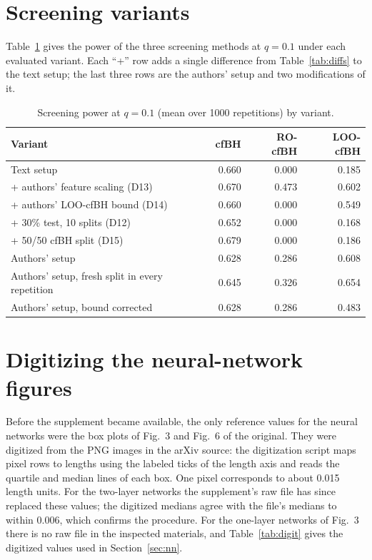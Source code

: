 \section{Screening variants}
\label{app:screen}

Table~\ref{tab:screenvar} gives the power of the three screening methods at $q=0.1$ under each evaluated variant. Each
``+'' row adds a single difference from Table~\ref{tab:diffs} to the text setup; the last three rows are the
authors' setup and two modifications of it.

\begin{table}[htbp]
\centering\small
\caption{Screening power at $q=0.1$ (mean over 1000 repetitions) by variant.}
\label{tab:screenvar}
\begin{tabular}{@{}lrrr@{}}
\toprule
Variant & cfBH & RO-cfBH & LOO-cfBH \\
\midrule
Text setup & 0.660 & 0.000 & 0.185 \\
+ authors' feature scaling (D13) & 0.670 & 0.473 & 0.602 \\
+ authors' LOO-cfBH bound (D14) & 0.660 & 0.000 & 0.549 \\
+ 30\% test, 10 splits (D12) & 0.652 & 0.000 & 0.168 \\
+ 50/50 cfBH split (D15) & 0.679 & 0.000 & 0.186 \\
\addlinespace
Authors' setup & 0.628 & 0.286 & 0.608 \\
Authors' setup, fresh split in every repetition & 0.645 & 0.326 & 0.654 \\
Authors' setup, bound corrected & 0.628 & 0.286 & 0.483 \\
\bottomrule
\end{tabular}
\end{table}

\section{Digitizing the neural-network figures}
\label{app:digitise}

Before the supplement became available, the only reference values for the neural networks were the box plots of Fig.~3 and
Fig.~6 of the original. They were digitized from the PNG images in the arXiv source: the digitization script maps pixel rows to
lengths using the labeled ticks of the length axis and reads the quartile and median lines of each box. One pixel
corresponds to about 0.015 length units. For the two-layer networks the supplement's raw file has since replaced these
values; the digitized medians agree with the file's medians to within 0.006, which confirms the procedure. For the
one-layer networks of Fig.~3 there is no raw file in the inspected materials, and Table~\ref{tab:digit} gives the digitized values used in
Section~\ref{sec:nn}.

